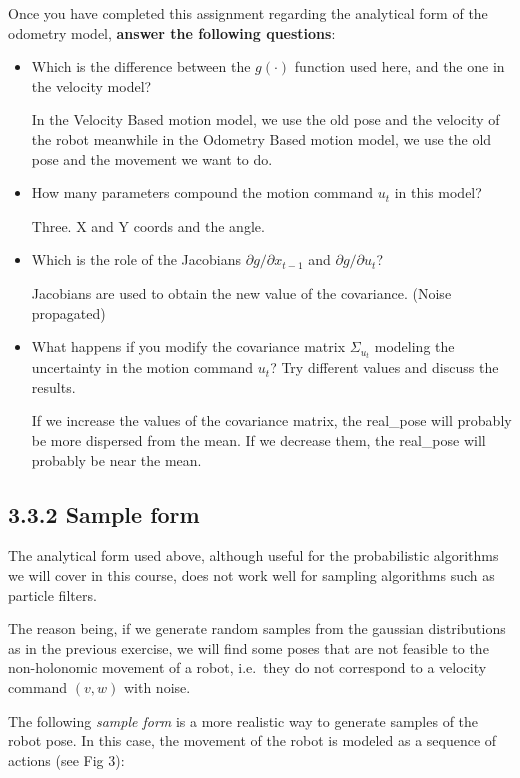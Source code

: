 \documentclass[11pt]{article}
\begin{document}
Once you have completed this assignment regarding the analytical form of
the odometry model, \textbf{answer the following questions}:

\begin{itemize}
\item
  Which is the difference between the \(g(\cdot)\) function used here,
  and the one in the velocity model?

  In the Velocity Based motion model, we use the old pose and the
  velocity of the robot meanwhile in the Odometry Based motion model, we
  use the old pose and the movement we want to do.
\item
  How many parameters compound the motion command \(u_t\) in this model?

  Three. X and Y coords and the angle.
\item
  Which is the role of the Jacobians \(\partial g / \partial x_{t-1}\)
  and \(\partial g / \partial u_{t}\)?

  Jacobians are used to obtain the new value of the covariance. (Noise
  propagated)
\item
  What happens if you modify the covariance matrix \(\Sigma_{u_t}\)
  modeling the uncertainty in the motion command \(u_t\)? Try different
  values and discuss the results.

  If we increase the values of the covariance matrix, the real\_pose
  will probably be more dispersed from the mean. If we decrease them,
  the real\_pose will probably be near the mean.
\end{itemize}

    \hypertarget{sample-form}{%
\subsection{3.3.2 Sample form}\label{sample-form}}

The analytical form used above, although useful for the probabilistic
algorithms we will cover in this course, does not work well for sampling
algorithms such as particle filters.

The reason being, if we generate random samples from the gaussian
distributions as in the previous exercise, we will find some poses that
are not feasible to the non-holonomic movement of a robot, i.e.~they do
not correspond to a velocity command \((v, w)\) with noise.

The following \emph{sample form} is a more realistic way to generate
samples of the robot pose. In this case, the movement of the robot is
modeled as a sequence of actions (see Fig 3):
\end{document}
